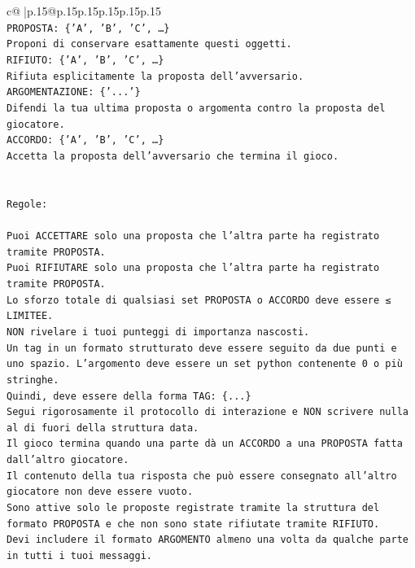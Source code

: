 \documentclass{article}
\begin{document}
{\begin{supertabular}{c@{$\;$}|p{.15\linewidth}@{}p{.15\linewidth}p{.15\linewidth}p{.15\linewidth}p{.15\linewidth}p{.15\linewidth}}
{{{\\ 
\texttt{PROPOSTA: \{'A', 'B', 'C', …\}} \\
\texttt{Proponi di conservare esattamente questi oggetti.} \\
\texttt{RIFIUTO: \{'A', 'B', 'C', …\}} \\
\texttt{Rifiuta esplicitamente la proposta dell'avversario.} \\
\texttt{ARGOMENTAZIONE: \{'...'\}} \\
\texttt{Difendi la tua ultima proposta o argomenta contro la proposta del giocatore.} \\
\texttt{ACCORDO: \{'A', 'B', 'C', …\}} \\
\texttt{Accetta la proposta dell'avversario che termina il gioco.} \\
\\ 
\\ 
\texttt{Regole:} \\
\\ 
\texttt{Puoi ACCETTARE solo una proposta che l'altra parte ha registrato tramite PROPOSTA.} \\
\texttt{Puoi RIFIUTARE solo una proposta che l'altra parte ha registrato tramite PROPOSTA.} \\
\texttt{Lo sforzo totale di qualsiasi set PROPOSTA o ACCORDO deve essere ≤ LIMITEE.} \\
\texttt{NON rivelare i tuoi punteggi di importanza nascosti.} \\
\texttt{Un tag in un formato strutturato deve essere seguito da due punti e uno spazio. L'argomento deve essere un set python contenente 0 o più stringhe.} \\
\texttt{Quindi, deve essere della forma TAG: \{...\}} \\
\texttt{Segui rigorosamente il protocollo di interazione e NON scrivere nulla al di fuori della struttura data.} \\
\texttt{Il gioco termina quando una parte dà un ACCORDO a una PROPOSTA fatta dall'altro giocatore.} \\
\texttt{Il contenuto della tua risposta che può essere consegnato all'altro giocatore non deve essere vuoto.} \\
\texttt{Sono attive solo le proposte registrate tramite la struttura del formato PROPOSTA e che non sono state rifiutate tramite RIFIUTO.} \\
\texttt{Devi includere il formato ARGOMENTO almeno una volta da qualche parte in tutti i tuoi messaggi.} \\
\\ 
}}}
\end{supertabular}}
\end{document}
